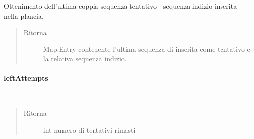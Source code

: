\documentclass[letterpaper,10pt,italian,openany,oneside]{sphinxmanual}
\begin{document}
\begin{fulllineitems}
\label{\detokenize{source/it/unicam/cs/pa/mastermind/gamecore/BoardModel:it.unicam.cs.pa.mastermind.gamecore.BoardModel.lastAttemptAndClue()}}
Ottenimento dell’ultima coppia sequenza tentativo - sequenza indizio inserita nella plancia.
\begin{quote}\begin{description}
\item[{Ritorna}] \leavevmode
Map.Entry contenente l’ultima sequenza di  inserita come tentativo e la relativa sequenza indizio.

\end{description}\end{quote}

\end{fulllineitems}



\paragraph{leftAttempts}
\label{\detokenize{source/it/unicam/cs/pa/mastermind/gamecore/BoardModel:leftattempts}}

\begin{fulllineitems}
\label{\detokenize{source/it/unicam/cs/pa/mastermind/gamecore/BoardModel:it.unicam.cs.pa.mastermind.gamecore.BoardModel.leftAttempts()}}~\begin{quote}\begin{description}
\item[{Ritorna}] \leavevmode
int numero di tentativi rimasti

\end{description}\end{quote}

\end{fulllineitems}
\end{document}
